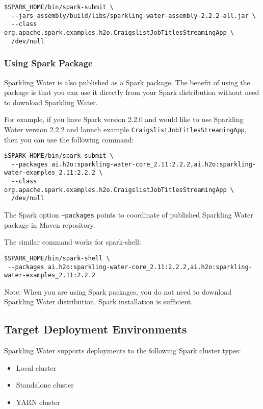 \pagebreak
\begin{lstlisting}[style=Bash]
$SPARK_HOME/bin/spark-submit \
  --jars assembly/build/libs/sparkling-water-assembly-2.2.2-all.jar \
  --class org.apache.spark.examples.h2o.CraigslistJobTitlesStreamingApp \
  /dev/null
\end{lstlisting}

\subsubsection{Using Spark Package}

Sparkling Water is also published as a Spark package. The benefit of using the package is that you can use it directly from your Spark distribution without need to download Sparkling Water.

For example, if you have Spark version 2.2.0 and would like to use Sparkling Water version 2.2.2 and launch example \texttt{CraigslistJobTitlesStreamingApp}, then you can use the following command:

\begin{lstlisting}[style=Bash]
$SPARK_HOME/bin/spark-submit \
  --packages ai.h2o:sparkling-water-core_2.11:2.2.2,ai.h2o:sparkling-water-examples_2.11:2.2.2 \
  --class org.apache.spark.examples.h2o.CraigslistJobTitlesStreamingApp \
  /dev/null
\end{lstlisting}

The Spark option \texttt{--packages} points to coordinate of published Sparkling Water package in Maven repository.

The similar command works for spark-shell:

\begin{lstlisting}[style=Bash]
$SPARK_HOME/bin/spark-shell \
 --packages ai.h2o:sparkling-water-core_2.11:2.2.2,ai.h2o:sparkling-water-examples_2.11:2.2.2 
\end{lstlisting}

Note: When you are using Spark packages, you do not need to download Sparkling Water distribution. Spark installation is sufficient.

\newpage
\subsection{Target Deployment Environments}
Sparkling Water supports deployments to the following Spark cluster types:
\begin{itemize}
	\item{Local cluster}
	\item{Standalone cluster} 
	\item{YARN cluster}
\end{itemize}

